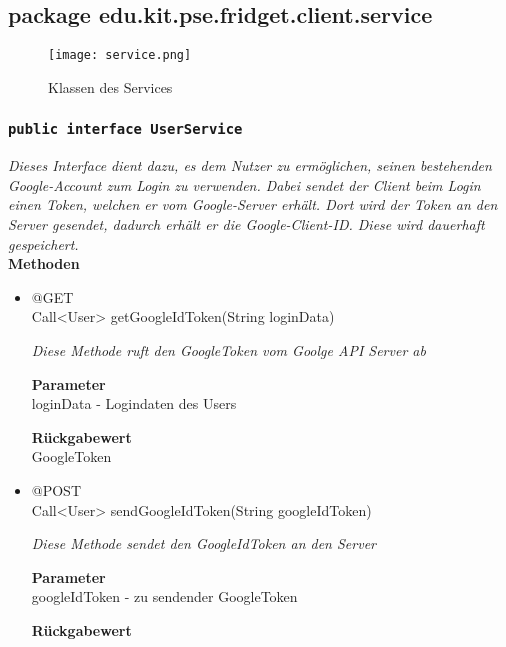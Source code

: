 
\subsection{package edu.kit.pse.fridget.client.service}
\begin{figure}[H]
	       \centering
	       \texttt{[image: service.png]}
	       \caption{Klassen des Services}
	      \end{figure}	
	\subsubsection{\texttt{public interface UserService}}
\textit{Dieses Interface dient dazu, es dem Nutzer zu ermöglichen, seinen bestehenden Google-Account zum Login zu verwenden. Dabei sendet der Client beim Login einen Token, welchen er vom Google-Server erhält. Dort wird der Token an den Server gesendet, dadurch erhält er die Google-Client-ID. Diese wird dauerhaft gespeichert.}\\

	\textbf{Methoden} \\
		\begin{itemize}
		\item{@GET\\ Call<User> getGoogleIdToken(String loginData)}

		\textit{Diese Methode ruft den GoogleToken vom Goolge API Server ab}

		\textbf{Parameter} \\
	loginData - Logindaten des Users

		\textbf{Rückgabewert} \\
	GoogleToken

      \item{@POST\\ Call<User> sendGoogleIdToken(String googleIdToken)}

		\textit{Diese Methode sendet den GoogleIdToken an den Server}

		\textbf{Parameter} \\
		googleIdToken - zu sendender GoogleToken

		\textbf{Rückgabewert} \\
	

	 \end{itemize}

